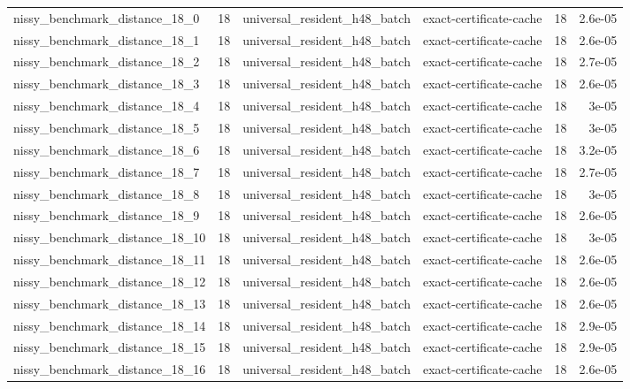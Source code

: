 {\begin{tabular}{lrllrr}
nissy\_benchmark\_distance\_18\_0 & 18 & universal\_resident\_h48\_batch & exact-certificate-cache & 18 & 2.6e-05 \\
nissy\_benchmark\_distance\_18\_1 & 18 & universal\_resident\_h48\_batch & exact-certificate-cache & 18 & 2.6e-05 \\
nissy\_benchmark\_distance\_18\_2 & 18 & universal\_resident\_h48\_batch & exact-certificate-cache & 18 & 2.7e-05 \\
nissy\_benchmark\_distance\_18\_3 & 18 & universal\_resident\_h48\_batch & exact-certificate-cache & 18 & 2.6e-05 \\
nissy\_benchmark\_distance\_18\_4 & 18 & universal\_resident\_h48\_batch & exact-certificate-cache & 18 & 3e-05 \\
nissy\_benchmark\_distance\_18\_5 & 18 & universal\_resident\_h48\_batch & exact-certificate-cache & 18 & 3e-05 \\
nissy\_benchmark\_distance\_18\_6 & 18 & universal\_resident\_h48\_batch & exact-certificate-cache & 18 & 3.2e-05 \\
nissy\_benchmark\_distance\_18\_7 & 18 & universal\_resident\_h48\_batch & exact-certificate-cache & 18 & 2.7e-05 \\
nissy\_benchmark\_distance\_18\_8 & 18 & universal\_resident\_h48\_batch & exact-certificate-cache & 18 & 3e-05 \\
nissy\_benchmark\_distance\_18\_9 & 18 & universal\_resident\_h48\_batch & exact-certificate-cache & 18 & 2.6e-05 \\
nissy\_benchmark\_distance\_18\_10 & 18 & universal\_resident\_h48\_batch & exact-certificate-cache & 18 & 3e-05 \\
nissy\_benchmark\_distance\_18\_11 & 18 & universal\_resident\_h48\_batch & exact-certificate-cache & 18 & 2.6e-05 \\
nissy\_benchmark\_distance\_18\_12 & 18 & universal\_resident\_h48\_batch & exact-certificate-cache & 18 & 2.6e-05 \\
nissy\_benchmark\_distance\_18\_13 & 18 & universal\_resident\_h48\_batch & exact-certificate-cache & 18 & 2.6e-05 \\
nissy\_benchmark\_distance\_18\_14 & 18 & universal\_resident\_h48\_batch & exact-certificate-cache & 18 & 2.9e-05 \\
nissy\_benchmark\_distance\_18\_15 & 18 & universal\_resident\_h48\_batch & exact-certificate-cache & 18 & 2.9e-05 \\
nissy\_benchmark\_distance\_18\_16 & 18 & universal\_resident\_h48\_batch & exact-certificate-cache & 18 & 2.6e-05 \\

\end{tabular}}
